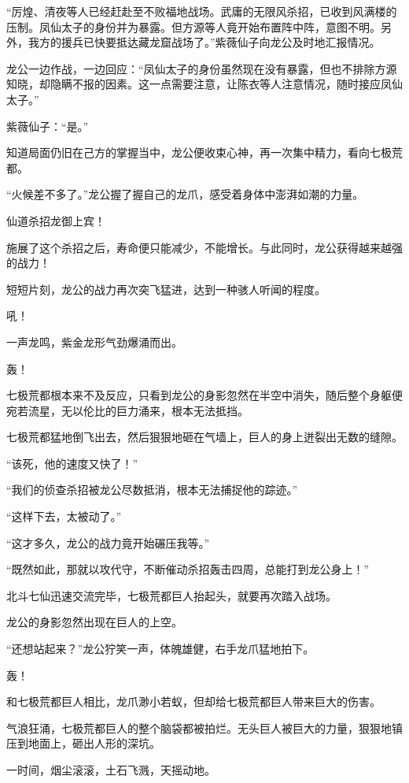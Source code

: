 \begin{this_body}
“厉煌、清夜等人已经赶赴至不败福地战场。武庸的无限风杀招，已收到风满楼的压制。凤仙太子的身份并为暴露。但方源等人竟开始布置阵中阵，意图不明。另外，我方的援兵已快要抵达藏龙窟战场了。”紫薇仙子向龙公及时地汇报情况。

龙公一边作战，一边回应：“凤仙太子的身份虽然现在没有暴露，但也不排除方源知晓，却隐瞒不报的因素。这一点需要注意，让陈衣等人注意情况，随时接应凤仙太子。”

紫薇仙子：“是。”

知道局面仍旧在己方的掌握当中，龙公便收束心神，再一次集中精力，看向七极荒都。

“火候差不多了。”龙公握了握自己的龙爪，感受着身体中澎湃如潮的力量。

仙道杀招龙御上宾！

施展了这个杀招之后，寿命便只能减少，不能增长。与此同时，龙公获得越来越强的战力！

短短片刻，龙公的战力再次突飞猛进，达到一种骇人听闻的程度。

吼！

一声龙鸣，紫金龙形气劲爆涌而出。

轰！

七极荒都根本来不及反应，只看到龙公的身影忽然在半空中消失，随后整个身躯便宛若流星，无以伦比的巨力涌来，根本无法抵挡。

七极荒都猛地倒飞出去，然后狠狠地砸在气墙上，巨人的身上迸裂出无数的缝隙。

“该死，他的速度又快了！”

“我们的侦查杀招被龙公尽数抵消，根本无法捕捉他的踪迹。”

“这样下去，太被动了。”

“这才多久，龙公的战力竟开始碾压我等。”

“既然如此，那就以攻代守，不断催动杀招轰击四周，总能打到龙公身上！”

北斗七仙迅速交流完毕，七极荒都巨人抬起头，就要再次踏入战场。

龙公的身影忽然出现在巨人的上空。

“还想站起来？”龙公狞笑一声，体魄雄健，右手龙爪猛地拍下。

轰！

和七极荒都巨人相比，龙爪渺小若蚁，但却给七极荒都巨人带来巨大的伤害。

气浪狂涌，七极荒都巨人的整个脑袋都被拍烂。无头巨人被巨大的力量，狠狠地镇压到地面上，砸出人形的深坑。

一时间，烟尘滚滚，土石飞溅，天摇动地。


\end{this_body}
